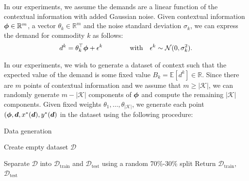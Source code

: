 In our experiments, we assume the demands are a linear function of the contextual information with added Gaussian noise. Given contextual information ${\bm{\phi}} \in \mathbb{R}^m$, a vector $\theta_k \in \mathbb{R}^m$ and the noise standard deviation $\sigma_k$, we can express the demand for commodity $k$ as follows:
\begin{align}
    d^k = \theta_k^\top {\bm{\phi}} + \epsilon^k \qquad\qquad\text{with}\quad \epsilon^k \sim \mathcal{N}(0, \sigma_k^2).
\end{align}

In our experiments, we wish to generate a dataset of context  such that the expected value of the demand is some fixed value $B_k = \mathbb{E}[d^k] \in \mathbb{R}$. Since there are $m$ points of contextual information and we assume that $m \geq |\mathcal{K}|$, we can randomly generate $m - |\mathcal{K}|$ components of ${\bm{\phi}}$ and compute the remaining $|\mathcal{K}|$ components. Given fixed weights $\theta_1, \ldots, \theta_{|\mathcal{K}|}$, we generate each point $({\bm{\phi}}, {\bm{d}}, x^*({\bm{d}}), y^*({\bm{d}})$ in the dataset using the following procedure:
\begin{algorithm}
    \caption{Data generation}\label{alg:eval:data-gen}
    \DontPrintSemicolon

    
    \BlankLine
    \nl Create empty dataset $\mathcal{D}$\;


    \nl Separate $\mathcal{D}$ into $\mathcal{D}_\text{train}$ and $\mathcal{D}_\text{test}$ using a random 70\%-30\% split\;
    \nl Return $\mathcal{D}_\text{train}$, $\mathcal{D}_\text{test}$\;
\end{algorithm}


